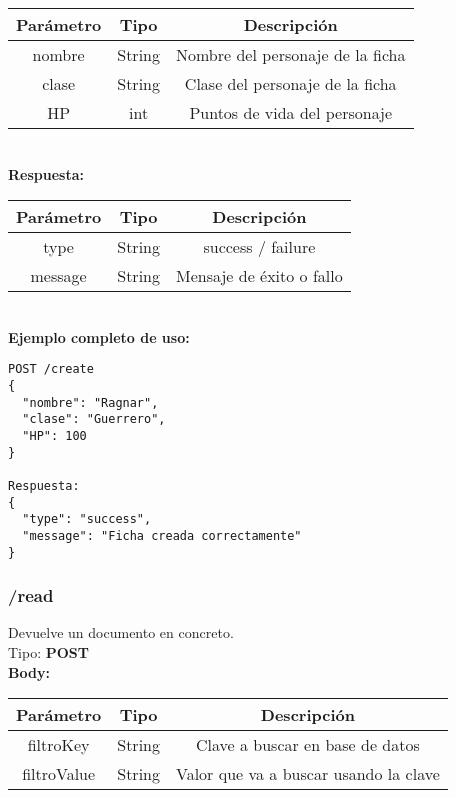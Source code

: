 \documentclass[a4paper,12pt]{article}
\begin{document}
\begin{tabular}{|c|c|c|}
    \hline
    \textbf{Parámetro} & \textbf{Tipo}  & \textbf{Descripción}\\ 
    \hline
    nombre & String & Nombre del personaje de la ficha\\ 
    \hline
    clase & String & Clase del personaje de la ficha\\ 
    \hline
    HP & int & Puntos de vida del personaje\\ 
    \hline
\end{tabular}\\[1em]

\textbf{Respuesta:}\\

\begin{tabular}{|c|c|c|}
    \hline
    \textbf{Parámetro} & \textbf{Tipo}  & \textbf{Descripción}\\ 
    \hline
    type & String & success / failure\\ 
    \hline
    message & String & Mensaje de éxito o fallo\\ 
    \hline
\end{tabular}\\[1em]

\textbf{Ejemplo completo de uso:}
\begin{verbatim}
POST /create
{
  "nombre": "Ragnar",
  "clase": "Guerrero",
  "HP": 100
}

Respuesta:
{
  "type": "success",
  "message": "Ficha creada correctamente"
}
\end{verbatim}

\FloatBarrier
\subsubsection{/read}
Devuelve un documento en concreto.\\

Tipo: \textbf{POST}\\[0.5em]

\textbf{Body:}\\

\begin{tabular}{|c|c|c|}
    \hline
    \textbf{Parámetro} & \textbf{Tipo}  & \textbf{Descripción}\\ 
    \hline
    filtroKey & String & Clave a buscar en base de datos\\ 
    \hline
    filtroValue & String & Valor que va a buscar usando la clave\\ 
    \hline
\end{tabular}\\[1em]
\end{document}
